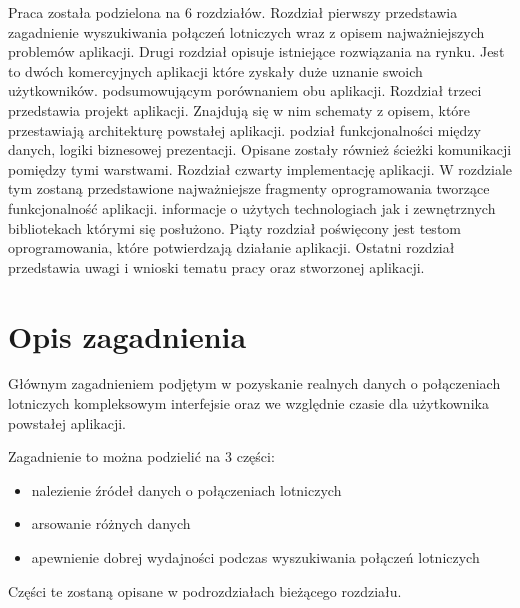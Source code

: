 \documentclass[12pt, twoside]{report}
\begin{document}
Praca została podzielona na 6 rozdziałów. Rozdział pierwszy przedstawia zagadnienie wyszukiwania połączeń lotniczych wraz z opisem najważniejszych problemów aplikacji. Drugi rozdział opisuje  istniejące rozwiązania  na rynku. Jest to  dwóch komercyjnych aplikacji które zyskały duże uznanie swoich użytkowników.  podsumowującym porównaniem obu aplikacji. Rozdział trzeci przedstawia projekt aplikacji. Znajdują się w nim schematy z opisem, które przestawiają architekturę powstałej aplikacji.  podział funkcjonalności między  danych,  logiki biznesowej  prezentacji. Opisane zostały również ścieżki komunikacji pomiędzy tymi warstwami.
Rozdział czwarty  implementację aplikacji. W rozdziale tym zostaną przedstawione najważniejsze fragmenty oprogramowania tworzące funkcjonalność aplikacji.  informacje o użytych technologiach jak i zewnętrznych bibliotekach którymi się posłużono. Piąty rozdział poświęcony jest testom oprogramowania, które potwierdzają  działanie aplikacji. Ostatni rozdział przedstawia uwagi i wnioski  tematu pracy oraz stworzonej aplikacji.

\chapter{Opis zagadnienia}
\label{chp:first}
Głównym zagadnieniem podjętym w   pozyskanie realnych danych o połączeniach lotniczych kompleksowym interfejsie oraz we względnie  czasie dla użytkownika powstałej aplikacji.

Zagadnienie to można podzielić na 3 części:
\begin{itemize}[noitemsep,topsep=0pt]
\item {}nalezienie źródeł danych o połączeniach lotniczych\add{,}
\item {}arsowanie różnych  danych\add{,}
\item {}apewnienie dobrej wydajności podczas wyszukiwania połączeń lotniczych
\end{itemize}
Części te zostaną opisane w podrozdziałach bieżącego rozdziału.
\end{document}
